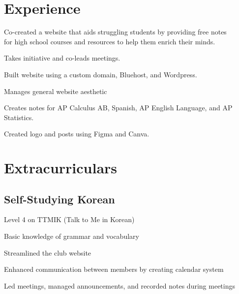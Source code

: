 \documentclass[]{deedy-resume-openfont}
\begin{document}
\begin{minipage}[t]{0.66\textwidth}
\section{Experience}
\begin{tightemize}
\item Co-created a website that aids struggling students by providing free notes \\ for high school courses and resources to help them enrich their minds.
\item Takes initiative and co-leads meetings.
\item Built website using a custom domain, Bluehost, and Wordpress.
\item Manages general website aesthetic
\item Creates notes for AP Calculus AB, Spanish, AP English Language, and AP Statistics.
\item Created logo and posts using Figma and Canva.
\end{tightemize}
\sectionsep




\section{Extracurriculars}

\subsection{Self-Studying Korean}

\begin{tightemize}
\item Level 4 on TTMIK (Talk to Me in Korean)
\item Basic knowledge of grammar and vocabulary
\end{tightemize}
\sectionsep


\begin{tightemize}
\item Streamlined the club website
\item Enhanced communication between members by creating calendar system
\item Led meetings, managed announcements, and recorded notes during meetings
\end{tightemize}
\sectionsep


\end{minipage}
\end{document}
